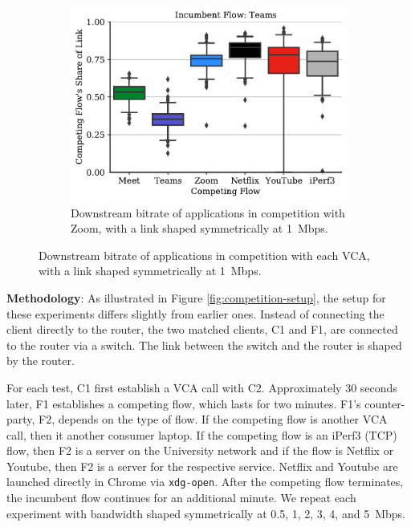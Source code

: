 \begin{figure}[t!]
\begin{subfigure}[t]{.33\textwidth}
    \includegraphics[width=1\textwidth]{figures/comp/box_plot_teams_dl_1.0.pdf}
    \caption{Downstream bitrate of applications in competition with Zoom, with a link shaped symmetrically at 1~Mbps.}
    \label{fig:zoom_box_1}
\end{subfigure}
\caption{Downstream bitrate of applications in competition with each VCA, with a link shaped symmetrically at 1~Mbps.}
\label{fig:interrupt-upld}
\end{figure}


\noindent \textbf{Methodology}: As illustrated in Figure \ref{fig:competition-setup}, the setup for these experiments differs slightly from earlier ones. 
Instead of connecting the client directly to the router, the two matched clients, C1 and F1, are connected to the router via a switch. 
The link between the switch and the router is shaped by the router.

For each test, C1 first establish a VCA call with C2.
Approximately 30 seconds later, F1 establishes a competing flow, which lasts for two minutes.
F1's counter-party, F2, depends on the type of flow.
If the competing flow is another VCA call, then it another consumer laptop.
If the competing flow is an iPerf3 (TCP) flow, then F2 is a server on the University network
  and if the flow is Netflix or Youtube, then F2 is a server for the respective service.
Netflix and Youtube are launched directly in Chrome via \texttt{xdg-open}.
After the competing flow terminates, the incumbent flow continues for an additional minute.
We repeat each experiment with bandwidth shaped symmetrically at 0.5, 1, 2, 3, 4, and 5~Mbps.



